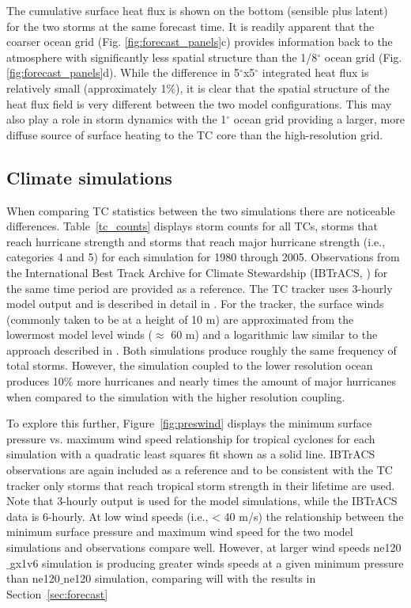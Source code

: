 \documentclass[draft,ms]{AGUTeX}
\newcommand{\degree}{$^{\circ}$}
\begin{document}
\begin{article}
The cumulative surface heat flux is shown on the bottom (sensible plus latent) for the two storms at the same forecast time. It is readily apparent that the coarser ocean grid (Fig. \ref{fig:forecast_panels}c) provides information back to the atmosphere with significantly less spatial structure than the 1/8\degree{} ocean grid (Fig. \ref{fig:forecast_panels}d). While the difference in 5\degree{}x5\degree{} integrated heat flux is relatively small (approximately 1\%), it is clear that the spatial structure of the heat flux field is very different between the two model configurations. This may also play a role in storm dynamics with the 1\degree{} ocean grid providing a larger, more diffuse source of surface heating to the TC core than the high-resolution grid.

\subsection{Climate simulations}
\label{sec:climate}
When comparing TC statistics between the two simulations there are noticeable differences.  Table~\ref{tc_counts} displays storm counts for all TCs, storms that reach hurricane strength and storms that reach major hurricane strength (i.e., categories 4 and 5) for each simulation for 1980 through 2005. Observations from the International Best Track Archive for Climate Stewardship (IBTrACS, \citet{Knapp2010}) for the same time period are provided as a reference. The TC tracker uses 3-hourly model output and is described in detail in \citet{Zhao2009}.  For the tracker, the surface winds (commonly taken to be at a height of 10 m) are approximated from the lowermost model level winds ($\approx$ 60 m) and a logarithmic law similar to the approach described in \citet{Zarzycki2014AMIPTCs}.  Both simulations produce roughly the same frequency of total storms.  However, the simulation coupled to the lower resolution ocean produces 10$\%$ more hurricanes and nearly times the amount of major hurricanes when compared to the simulation with the higher resolution coupling.

To explore this further, Figure~\ref{fig:preswind} displays the minimum surface pressure vs. maximum wind speed relationship for tropical cyclones for each simulation with a quadratic least squares fit shown as a solid line. IBTrACS observations are again included as a reference and to be consistent with the TC tracker only storms that reach tropical storm strength in their lifetime are used. Note that 3-hourly output is used for the model simulations, while the IBTrACS data is 6-hourly.  At low wind speeds (i.e., < 40 m/s) the relationship between the minimum surface pressure and maximum wind speed for the two model simulations and observations compare well.  However, at larger wind speeds ne120$\_$gx1v6 simulation is producing greater winds speeds at a given minimum pressure than ne120$\_$ne120 simulation, comparing will with the results in Section~\ref{sec:forecast}


\end{article}
\end{document}
